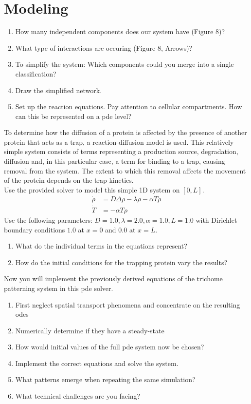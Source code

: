 \section{Modeling}
\begin{enumerate}
    \item How many independent components does our system have (Figure 8)?
    \item What type of interactions are occuring (Figure 8, Arrows)?
    \item To simplify the system: Which components could you merge into a single classification?
    \item Draw the simplified network.
    \item Set up the reaction equations.
    Pay attention to cellular compartments.
    How can this be represented on a \ac{pde} level?
\end{enumerate}
%
%
To determine how the diffusion of a protein is affected by the presence of another protein that acts as a trap, a reaction-diffusion model is used. This relatively simple system consists of terms representing a production
source, degradation, diffusion and, in this particular case, a term for binding to a trap, causing removal from the system. The extent to which this removal affects the movement of the protein depends on the trap kinetics.\\
Use the provided solver to model this simple 1D system on $[0,L]$.
\begin{align}
    \dot{\rho} &= D\Delta\rho - \lambda\rho - \alpha T\rho\\
    \dot{T} &= -\alpha T\rho
\end{align}
Use the following parameters: $D=1.0,\lambda=2.0,\alpha=1.0,L=1.0$ with Dirichlet boundary conditions $1.0$ at $x=0$ and $0.0$ at $x=L$.
\begin{enumerate}
    \item What do the individual terms in the equations represent?
    \item How do the initial conditions for the trapping protein vary the results?
\end{enumerate}
%
%
Now you will implement the previously derived equations of the trichome patterning system in this \ac{pde} solver.
\begin{enumerate}
    \item First neglect spatial transport phenomena and concentrate on the resulting \acp{ode}
    \item Numerically determine if they have a steady-state
    \item How would initial values of the full \ac{pde} system now be chosen?
    \item Implement the correct equations and solve the system.
    \item What patterns emerge when repeating the same simulation?
    \item What technical challenges are you facing?
\end{enumerate}
%
%
